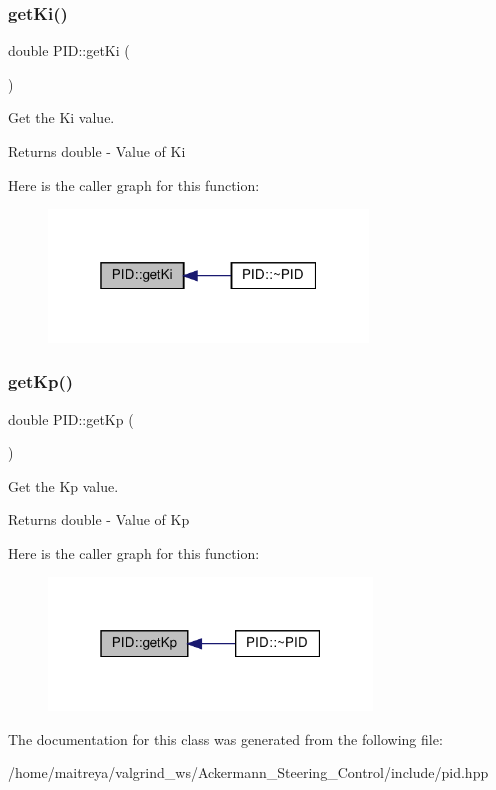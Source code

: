 \subsubsection{\texorpdfstring{get\+Ki()}{getKi()}}
{\footnotesize\ttfamily double P\+I\+D\+::get\+Ki (\begin{DoxyParamCaption}{ }\end{DoxyParamCaption})}



Get the Ki value. 

\begin{DoxyReturn}{Returns}
double -\/ Value of Ki 
\end{DoxyReturn}
Here is the caller graph for this function\+:
\nopagebreak
\begin{figure}[H]
\begin{center}
\leavevmode
\includegraphics[width=241pt]{classPID_a89dedae29ef5a1359fd438824523bfc5_icgraph}
\end{center}
\end{figure}
\mbox{\label{classPID_a52625de61b1b2977b2c26ddb2698f14e}} 
\subsubsection{\texorpdfstring{get\+Kp()}{getKp()}}
{\footnotesize\ttfamily double P\+I\+D\+::get\+Kp (\begin{DoxyParamCaption}{ }\end{DoxyParamCaption})}



Get the Kp value. 

\begin{DoxyReturn}{Returns}
double -\/ Value of Kp 
\end{DoxyReturn}
Here is the caller graph for this function\+:
\nopagebreak
\begin{figure}[H]
\begin{center}
\leavevmode
\includegraphics[width=244pt]{classPID_a52625de61b1b2977b2c26ddb2698f14e_icgraph}
\end{center}
\end{figure}


The documentation for this class was generated from the following file\+:\begin{DoxyCompactItemize}
\item 
/home/maitreya/valgrind\+\_\+ws/\+Ackermann\+\_\+\+Steering\+\_\+\+Control/include/pid.\+hpp\end{DoxyCompactItemize}
